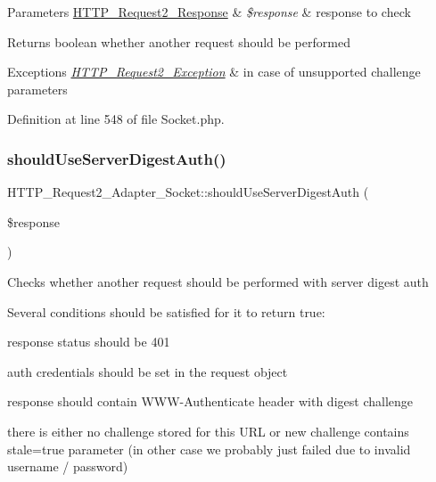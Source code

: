 \begin{DoxyParams}[1]{Parameters}
\hyperlink{classHTTP__Request2__Response}{H\+T\+T\+P\+\_\+\+Request2\+\_\+\+Response} & {\em \$response} & response to check\\
\hline
\end{DoxyParams}
\begin{DoxyReturn}{Returns}
boolean whether another request should be performed 
\end{DoxyReturn}

\begin{DoxyExceptions}{Exceptions}
{\em \hyperlink{classHTTP__Request2__Exception}{H\+T\+T\+P\+\_\+\+Request2\+\_\+\+Exception}} & in case of unsupported challenge parameters \\
\hline
\end{DoxyExceptions}


Definition at line 548 of file Socket.\+php.

\mbox{\label{classHTTP__Request2__Adapter__Socket_a3d9def9a7ef3725d00b81fa224eedeb3}} 
\subsubsection{\texorpdfstring{should\+Use\+Server\+Digest\+Auth()}{shouldUseServerDigestAuth()}}
{\footnotesize\ttfamily H\+T\+T\+P\+\_\+\+Request2\+\_\+\+Adapter\+\_\+\+Socket\+::should\+Use\+Server\+Digest\+Auth (\begin{DoxyParamCaption}\item[{\hyperlink{classHTTP__Request2__Response}{H\+T\+T\+P\+\_\+\+Request2\+\_\+\+Response}}]{\$response }\end{DoxyParamCaption})\hspace{0.3cm}{\ttfamily [protected]}}

Checks whether another request should be performed with server digest auth

Several conditions should be satisfied for it to return true\+:
\begin{DoxyItemize}
\item response status should be 401
\item auth credentials should be set in the request object
\item response should contain W\+W\+W-\/\+Authenticate header with digest challenge
\item there is either no challenge stored for this U\+RL or new challenge contains stale=true parameter (in other case we probably just failed due to invalid username / password)
\end{DoxyItemize}


